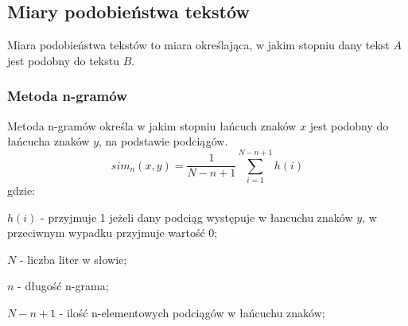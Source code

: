 \documentclass{classrep}
\begin{document}
\subsection{Miary podobieństwa tekstów}
Miara podobieństwa tekstów to miara określająca, w jakim stopniu dany tekst $A$ jest podobny do tekstu $B$.

\subsubsection{Metoda n-gramów} \label{n_gram}
Metoda n-gramów określa w jakim stopniu łańcuch znaków $x$ jest podobny do łańcucha znaków $y$, na podstawie podciągów.
\begin{equation}
    sim_{n}(x,y)=\frac{1}{N-n+1}\sum_{i=1}^{N-n+1}h(i)
\end{equation}
gdzie:\\
\begin{description}
    \item $h(i)$ - przyjmuje 1 jeżeli dany podciąg występuje w łancuchu znaków $y$, w przeciwnym wypadku przyjmuje wartość 0;
    \item $N$ - liczba liter w słowie;
    \item $n$ - długość n-grama;
    \item $N-n+1$ - ilość n-elementowych podciągów w łańcuchu znaków;
\end{description}

%
\end{document}
